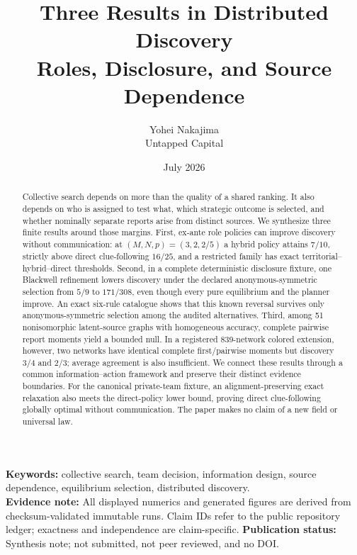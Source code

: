 \documentclass[11pt]{article}
\title{\textbf{Three Results in Distributed Discovery}\\[0.35em]
\large Roles, Disclosure, and Source Dependence}
\author{Yohei Nakajima\\{\normalsize Untapped Capital}}
\date{July 2026}
\theoremstyle{remark}
\begin{document}
\maketitle

\begin{abstract}
Collective search depends on more than the quality of a shared ranking. It also
depends on who is assigned to test what, which strategic outcome is selected, and
whether nominally separate reports arise from distinct sources. We synthesize
three finite results around those margins. First, ex-ante role policies can improve
discovery without communication: at $(M,N,p)=(3,2,2/5)$ a hybrid policy attains
$7/10$, strictly above direct clue-following $16/25$, and a restricted family has
exact territorial--hybrid--direct thresholds. Second, in a complete deterministic
disclosure fixture, one Blackwell refinement lowers discovery under the declared
anonymous-symmetric selection from $5/9$ to $171/308$, even though every pure
equilibrium and the planner improve. An exact six-rule catalogue shows that this
known reversal survives only anonymous-symmetric selection among the audited
alternatives. Third, among 51 nonisomorphic latent-source
graphs with homogeneous accuracy, complete pairwise report moments yield a bounded
null. In a registered 839-network colored extension, however, two networks have
identical complete first/pairwise moments but discovery $3/4$ and $2/3$; average
agreement is also insufficient. We connect these results through a common
information--action framework and preserve their distinct evidence boundaries.
For the canonical private-team fixture, an alignment-preserving exact relaxation
also meets the direct-policy lower bound, proving direct clue-following globally
optimal without communication.
The paper makes no claim of a new field or universal law.
\end{abstract}

\noindent\textbf{Keywords:} collective search, team decision, information design,
source dependence, equilibrium selection, distributed discovery.\\
\textbf{Evidence note:} All displayed numerics and generated figures are derived
from checksum-validated immutable runs. Claim IDs refer to the public repository
ledger; exactness and independence are claim-specific.
\textbf{Publication status:} Synthesis note; not submitted, not peer reviewed,
and no DOI.
\end{document}
